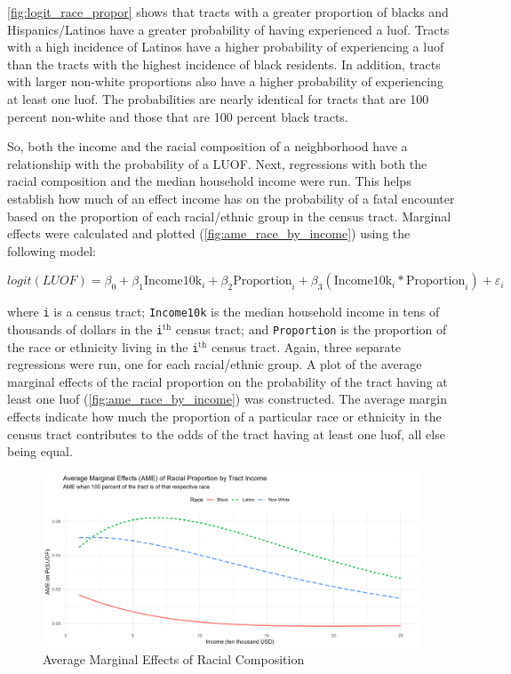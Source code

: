 \documentclass[12pt]{article}
\begin{document}
\autoref{fig:logit_race_propor} shows that tracts with a greater proportion of blacks and Hispanics/Latinos have a greater probability of having experienced a \acrfull{luof}. Tracts with a high incidence of Latinos have a higher probability of experiencing a \acrshort{luof} than the tracts with the highest incidence of black residents. In addition, tracts with larger non-white proportions also have a higher probability of experiencing at least one \acrshort{luof}. The probabilities are nearly identical for tracts that are 100 percent non-white and those that are 100 percent black tracts.

So, both the income and the racial composition of a neighborhood have a relationship with the probability of a LUOF. Next, regressions with both the racial composition and the median household income were run. This helps establish how much of an effect income has on the probability of a fatal encounter based on the proportion of each racial/ethnic group in the census tract. Marginal effects were calculated and plotted (\autoref{fig:ame_race_by_income}) using the following model:

\begin{equation}
logit(LUOF) = \beta_0 + \beta_1 \text{Income10k}_i + \beta_2 \text{Proportion}_i + \beta_3 (\text{Income10k}_i \ast \text{Proportion}_i) + \varepsilon_i
\label{eq:logit_interaction}
\end{equation}

\noindent{}where \texttt{i} is a census tract; \texttt{Income10k} is the median household income in tens of thousands of dollars in the \texttt{i}$^\text{th}$ census tract; and \texttt{Proportion} is the proportion of the race or ethnicity living in the \texttt{i}$^\text{th}$ census tract. Again, three separate regressions were run, one for each racial/ethnic group. A plot of the average marginal effects of the racial proportion on the probability of the tract having at least one \acrshort{luof} (\autoref{fig:ame_race_by_income}) was constructed. The average margin effects indicate how much the proportion of a particular race or ethnicity in the census tract contributes to the odds of the tract having at least one \acrshort{luof}, all else being equal.

\begin{figure}[H]
  \centering
  \includegraphics[width=\linewidth]{images/ame_race_by_income}
  \captionsetup{justification=centering, singlelinecheck=false, margin=2cm}
  \caption{Average Marginal Effects of Racial Composition}
  \label{fig:ame_race_by_income}
\end{figure}
\end{document}
